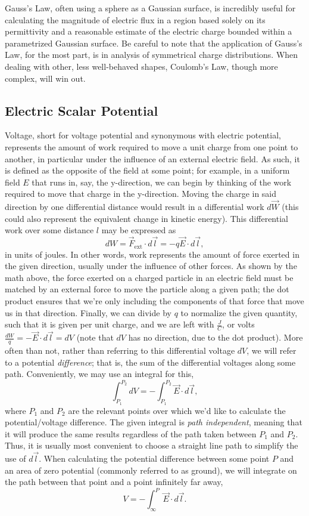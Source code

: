 \documentclass{article}
\begin{document}
Gauss's Law, often using a sphere as a Gaussian surface, is incredibly useful for calculating the magnitude of electric flux in a region based solely on its permittivity and a reasonable estimate of the electric charge bounded within a parametrized Gaussian surface. Be careful to note that the application of Gauss's Law, for the most part, is in analysis of symmetrical charge distributions. When dealing with other, less well-behaved shapes, Coulomb's Law, though more complex, will win out. 

\setcounter{subsection}{4}
\subsection{Electric Scalar Potential}

Voltage, short for voltage potential and synonymous with electric potential, represents the amount of work required to move a unit charge from one point to another, in particular under the influence of an external electric field. As such, it is defined as the opposite of the field at some point; for example, in a uniform field \(E\) that runs in, say, the y-direction, we can begin by thinking of the work required to move that charge in the  y-direction. Moving the charge in said direction by one differential distance would result in a differential work \(d \vec{W}\) (this could also represent the equivalent change in kinetic energy). This differential work over some distance \(l\) may be expressed as 
\[
	dW = \vec{F}_{\mathrm{ext}} \cdot d \vec{l} = -q \vec{E} \cdot d \vec{l},
\]
in units of joules. In other words, work represents the amount of force exerted in the given direction, usually under the influence of other forces. As shown by the math above, the force exerted on a charged particle in an electric field must be matched by an external force to move the particle along a given path; the dot product ensures that we're only including the components of that force that move us in that direction. Finally, we can divide by \(q\) to normalize the given quantity, such that it is given per unit charge, and we are left with \(\frac{J}{C}\), or volts \(\frac{dW}{q} = - \vec{E} \cdot d \vec{l} = dV\) (note that \(dV\) has no direction, due to the dot product). More often than not, rather than referring to this differential voltage \(dV\), we will refer to a potential \textit{difference}; that is, the sum of the differential voltages along some path. Conveniently, we may use an integral for this, 
\[
  \int_{P_1}^{P_2}dV = -\int_{P_1}^{P_2}\vec{E} \cdot d \vec{l},
\]
where \(P_1\) and \(P_2\) are the relevant points over which we'd like to calculate the potential/voltage difference. The given integral is \textit{path independent}, meaning that it will produce the same results regardless of the path taken between \(P_1\) and \(P_2\). Thus, it is usually most convenient to choose a straight line path to simplify the use of \(d \vec{l}\). When calculating the potential difference between some point \(P\) and an area of zero potential (commonly referred to as ground), we will integrate on the path between that point and a point infinitely far away, 
\[
  V = -\int_{\infty}^{P}\vec{E}\cdot d \vec{l}.
\]
\end{document}
